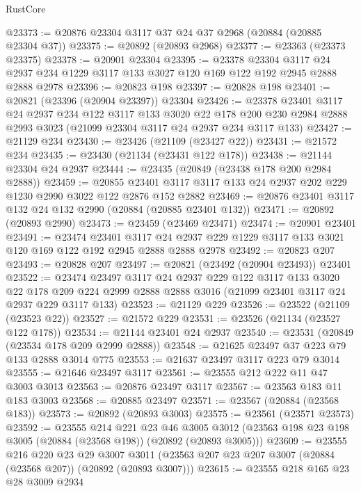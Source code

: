 \begin{lexlean}{RustCore}
\begin{coremodule}
@23373 := @20876 @23304 @3117 @37 @24 @37 @2968 (@20884 (@20885 @23304 @37))
@23375 := @20892 (@20893 @2968)
@23377 := @23363 (@23373 @23375)
@23378 := @20901 @23304
@23395 := @23378
    @23304
    @3117
    @24
    @2937
    @234
    @1229
    @3117
    @133
    @3027
    @120
    @169
    @122
    @192
    @2945
    @2888
    @2888
    @2978
@23396 := @20823 @198
@23397 := @20828 @198
@23401 := @20821 (@23396 (@20904 @23397)) @23304
@23426 := @23378
    @23401
    @3117
    @24
    @2937
    @234
    @122
    @3117
    @133
    @3020
    @22
    @178
    @200
    @230
    @2984
    @2888
    @2993
    @3023
    (@21099 @23304 @3117 @24 @2937 @234 @3117 @133)
@23427 := @21129 @234
@23430 := @23426 (@21109 (@23427 @22))
@23431 := @21572 @234
@23435 := @23430 (@21134 (@23431 @122 @178))
@23438 := @21144 @23304 @24 @2937
@23444 := @23435 (@20849 (@23438 @178 @200 @2984 @2888))
@23459 := @20855 @23401 @3117 @3117 @133 @24 @2937 @202 @229 @1230 @2990 @3022 @122 @2876 @152 @2882
@23469 := @20876 @23401 @3117 @132 @24 @132 @2990 (@20884 (@20885 @23401 @132))
@23471 := @20892 (@20893 @2990)
@23473 := @23459 (@23469 @23471)
@23474 := @20901 @23401
@23491 := @23474
    @23401
    @3117
    @24
    @2937
    @229
    @1229
    @3117
    @133
    @3021
    @120
    @169
    @122
    @192
    @2945
    @2888
    @2888
    @2978
@23492 := @20823 @207
@23493 := @20828 @207
@23497 := @20821 (@23492 (@20904 @23493)) @23401
@23522 := @23474
    @23497
    @3117
    @24
    @2937
    @229
    @122
    @3117
    @133
    @3020
    @22
    @178
    @209
    @224
    @2999
    @2888
    @2888
    @3016
    (@21099 @23401 @3117 @24 @2937 @229 @3117 @133)
@23523 := @21129 @229
@23526 := @23522 (@21109 (@23523 @22))
@23527 := @21572 @229
@23531 := @23526 (@21134 (@23527 @122 @178))
@23534 := @21144 @23401 @24 @2937
@23540 := @23531 (@20849 (@23534 @178 @209 @2999 @2888))
@23548 := @21625 @23497 @37 @223 @79 @133 @2888 @3014 @775
@23553 := @21637 @23497 @3117 @223 @79 @3014
@23555 := @21646 @23497 @3117
@23561 := @23555 @212 @222 @11 @47 @3003 @3013
@23563 := @20876 @23497 @3117
@23567 := @23563 @183 @11 @183 @3003
@23568 := @20885 @23497
@23571 := @23567 (@20884 (@23568 @183))
@23573 := @20892 (@20893 @3003)
@23575 := @23561 (@23571 @23573)
@23592 := @23555
    @214
    @221
    @23
    @46
    @3005
    @3012
    (@23563 @198 @23 @198 @3005 (@20884 (@23568 @198)) (@20892 (@20893 @3005)))
@23609 := @23555
    @216
    @220
    @23
    @29
    @3007
    @3011
    (@23563 @207 @23 @207 @3007 (@20884 (@23568 @207)) (@20892 (@20893 @3007)))
@23615 := @23555 @218 @165 @23 @28 @3009 @2934

\end{coremodule}
\end{lexlean}
